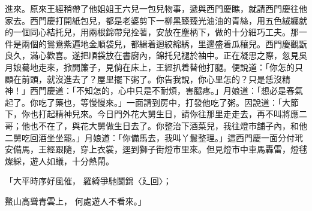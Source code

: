 進來。原來王經稍帶了他姐姐王六兒一包兒物事，遞與西門慶瞧，就請西門慶往他家去。西門慶打開紙包兒，都是老婆剪下一柳黑臻臻光油油的青絲，用五色絨纏就的一個同心結托兒，用兩根錦帶兒拴著，安放在塵柄下，做的十分細巧工夫。那一件是兩個的鴛鴦紫遍地金順袋兒，都緝着迴絞綿綉，里邊盛着瓜穰兒。西門慶觀翫良久，滿心歡喜。遂把順袋放在書廚內，錦托兒褪於袖中。正在凝思之際，忽見吳月娘驀地走來，掀開簾子，見倘在床上，王經扒着替他打腿。便說道：「你怎的只顧在前頭，就沒進去了？屋里擺下粥了。你告我說，你心里怎的？只是恁沒精神！」西門慶道：「不知怎的，心中只是不耐煩，害腿疼。」月娘道：「想必是春氣起了。你吃了藥也，等慢慢來。」一面請到房中，打發他吃了粥。因說道：「大節下，你也打起精神兒來。今日門外花大舅生日，請你往那里走走去，再不叫將應二哥；他也不在了，與花大舅做生日去了。你整治下酒菜兒，我往燈巿舖子內，和他二舅吃回酒坐坐罷。」月娘道：「你備馬去，我叫丫鬟整理。」這西門慶一面分付玳安備馬，王經跟隨，穿上衣裳，逕到獅子街燈巿里來。但見燈巿中車馬轟雷，燈毬燦綵，遊人如蟻，十分熱鬧。

「大平時序好風催，  羅綺爭馳鬬錦〈廴回〉；

鰲山高聳青雲上，  何處遊人不看來。」

